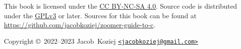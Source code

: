 %


\thispagestyle{empty}

\begingroup
\hspace{0pt}
\vfill
\begin{small}
	\noindent
	This book is licensed under the \href{https://creativecommons.%
	org/licenses/by-nc-sa/4.0/}{CC BY-NC-SA 4.0}.  Source code is
	distributed under the \href{https://www.gnu.org/licenses/gpl-3.%
	0.html}{GPLv3} or later.  Sources for this book can be found at
	\url{https://github.com/jacobkoziej/zoomer-guide-to-c}.

	\vspace{1em}

	\noindent
	Copyright \copyright\ 2022--2023 Jacob~Koziej \texttt{\href{%
	mailto:jacobkoziej@gmail.com}{<jacobkoziej@gmail.com>}}
\end{small}
\endgroup

\cleardoublepage
